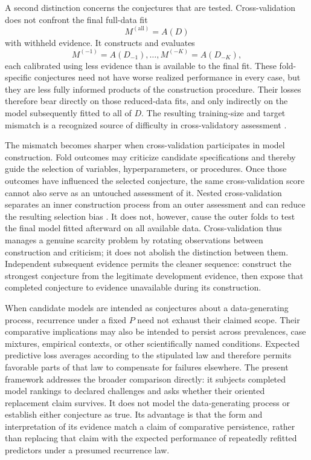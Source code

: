\documentclass[11pt]{article}
\theoremstyle{remark}
\begin{document}
A second distinction concerns the conjectures that are tested. Cross-validation
does not confront the final full-data fit
\[
M^{(\mathrm{all})}=A(D)
\]
with withheld evidence. It constructs and evaluates
\[
M^{(-1)}=A(D_{-1}),\ldots,M^{(-K)}=A(D_{-K}),
\]
each calibrated using less evidence than is available to the final fit. These
fold-specific conjectures need not have worse realized performance in every
case, but they are less fully informed products of the construction procedure.
Their losses therefore bear directly on those reduced-data fits, and only
indirectly on the model subsequently fitted to all of $D$. The resulting
training-size and target mismatch is a recognized source of difficulty in
cross-validatory assessment
\cite{burman1989comparative,bates2024crossvalidation}.

The mismatch becomes sharper when cross-validation participates in model
construction. Fold outcomes may criticize candidate specifications and thereby
guide the selection of variables, hyperparameters, or procedures. Once those
outcomes have influenced the selected conjecture, the same cross-validation
score cannot also serve as an untouched assessment of it. Nested
cross-validation separates an inner construction process from an outer
assessment and can reduce the resulting selection bias
\cite{varma2006bias,cawley2010overfitting}. It does not, however, cause the
outer folds to test the final model fitted afterward on all available data.
Cross-validation thus manages a genuine scarcity problem by rotating
observations between construction and criticism; it does not abolish the
distinction between them. Independent subsequent evidence permits the cleaner
sequence: construct the strongest conjecture from the legitimate development
evidence, then expose that completed conjecture to evidence unavailable during
its construction.

When candidate models are intended as conjectures about a data-generating
process, recurrence under a fixed $P$ need not exhaust their claimed scope.
Their comparative implications may also be intended to persist across
prevalences, case mixtures, empirical contexts, or other scientifically named
conditions. Expected predictive loss averages according to the stipulated law
and therefore permits favorable parts of that law to compensate for failures
elsewhere. The present framework addresses the broader comparison directly:
it subjects completed model rankings to declared challenges and asks whether
their oriented replacement claim survives. It does not model the
data-generating process or establish either conjecture as true. Its advantage
is that the form and interpretation of its evidence match a claim of
comparative persistence, rather than replacing that claim with the expected
performance of repeatedly refitted predictors under a presumed recurrence law.
\end{document}
